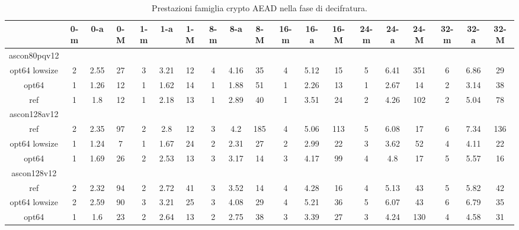 \begin{landscape}
    \begin{table}[]
        \caption{Prestazioni famiglia crypto AEAD nella fase di decifratura.}
        \begin{adjustbox}{width=600pt}
            \centering
			\begin{tabular}{|c|c|c|c|c|c|c|c|c|c|c|c|c|c|c|c|c|c|c|}
				\hline
				& 0-m & 0-a & 0-M & 1-m & 1-a & 1-M & 8-m & 8-a & 8-M & 16-m & 16-a & 16-M & 24-m & 24-a & 24-M & 32-m & 32-a & 32-M \\
				\hline
				ascon80pqv12 & & & & & & & & & & & & & & & & & & \\
				\hline
				opt64 lowsize & 2 & 2.55 & 27 & 3 & 3.21 & 12 & 4 & 4.16 & 35 & 4 & 5.12 & 15 & 5 & 6.41 & 351 & 6 & 6.86 & 29 \\
				\hline
				opt64 & 1 & 1.26 & 12 & 1 & 1.62 & 14 & 1 & 1.88 & 51 & 1 & 2.26 & 13 & 1 & 2.67 & 14 & 2 & 3.14 & 38 \\
				\hline
				ref & 1 & 1.8 & 12 & 1 & 2.18 & 13 & 1 & 2.89 & 40 & 1 & 3.51 & 24 & 2 & 4.26 & 102 & 2 & 5.04 & 78 \\
				\hline
				ascon128av12 & & & & & & & & & & & & & & & & & & \\
				\hline
				ref & 2 & 2.35 & 97 & 2 & 2.8 & 12 & 3 & 4.2 & 185 & 4 & 5.06 & 113 & 5 & 6.08 & 17 & 6 & 7.34 & 136 \\
				\hline
				opt64 lowsize & 1 & 1.24 & 7 & 1 & 1.67 & 24 & 2 & 2.31 & 27 & 2 & 2.99 & 22 & 3 & 3.62 & 52 & 4 & 4.11 & 22 \\
				\hline
				opt64 & 1 & 1.69 & 26 & 2 & 2.53 & 13 & 3 & 3.17 & 14 & 3 & 4.17 & 99 & 4 & 4.8 & 17 & 5 & 5.57 & 16 \\
				\hline
				ascon128v12 & & & & & & & & & & & & & & & & & & \\
				\hline
				ref & 2 & 2.32 & 94 & 2 & 2.72 & 41 & 3 & 3.52 & 14 & 4 & 4.28 & 16 & 4 & 5.13 & 43 & 5 & 5.82 & 42 \\
				\hline
				opt64 lowsize & 2 & 2.59 & 90 & 3 & 3.21 & 25 & 3 & 4.08 & 29 & 4 & 5.21 & 36 & 5 & 6.07 & 43 & 6 & 6.79 & 35 \\
				\hline
				opt64 & 1 & 1.6 & 23 & 2 & 2.64 & 13 & 2 & 2.75 & 38 & 3 & 3.39 & 27 & 3 & 4.24 & 130 & 4 & 4.58 & 31 \\
				\hline
			\end{tabular}
		\end{adjustbox}
	\end{table}
\end{landscape}

